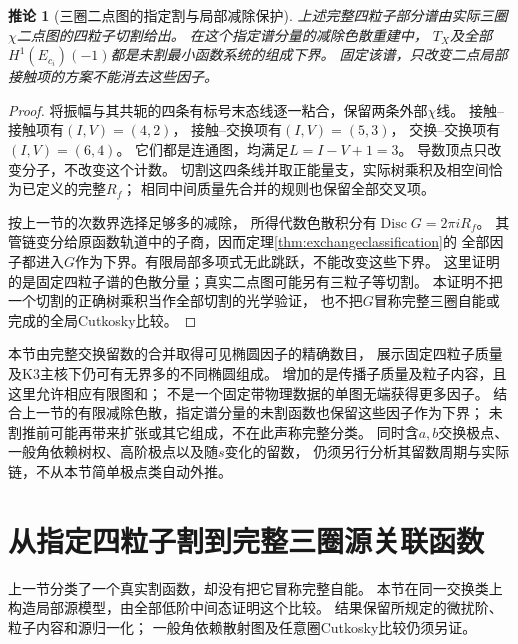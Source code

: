 \documentclass[11pt,a4paper]{ctexart}
\theoremstyle{cnplain}\newtheorem{theorem}{定理}[section]
\newtheorem{corollary}[theorem]{推论}
\theoremstyle{definition}\newtheorem{definition}[theorem]{定义}
\theoremstyle{remark}\newtheorem{remark}[theorem]{注}
\begin{document}
\begin{corollary}[三圈二点图的指定割与局部减除保护]\label{cor:exchangethreeloop}
上述完整四粒子部分谱由实际三圈$\chi$二点图的四粒子切割给出。
在这个指定谱分量的减除色散重建中，
$T_X$及全部$H^1(E_{c_i})(-1)$都是未割最小函数系统的组成下界。
固定该谱，只改变二点局部接触项的方案不能消去这些因子。
\end{corollary}
\begin{proof}
将振幅与其共轭的四条有标号末态线逐一粘合，保留两条外部$\chi$线。
接触--接触项有$(I,V)=(4,2)$，
接触--交换项有$(I,V)=(5,3)$，
交换--交换项有$(I,V)=(6,4)$。
它们都是连通图，均满足$L=I-V+1=3$。
导数顶点只改变分子，不改变这个计数。
切割这四条线并取正能量支，实际树乘积及相空间恰为已定义的完整$R_f$；
相同中间质量先合并的规则也保留全部交叉项。

按上一节的次数界选择足够多的减除，
所得代数色散积分有$\operatorname{Disc}G=2\pi iR_f$。
其管链变分给原函数轨道中的子商，因而定理\ref{thm:exchangeclassification}的
全部因子都进入$G$作为下界。有限局部多项式无此跳跃，不能改变这些下界。
这里证明的是固定四粒子谱的色散分量；真实二点图可能另有三粒子等切割。
本证明不把一个切割的正确树乘积当作全部切割的光学验证，
也不把$G$冒称完整三圈自能或完成的全局Cutkosky比较。
\end{proof}

本节由完整交换留数的合并取得可见椭圆因子的精确数目，
展示固定四粒子质量及K3主核下仍可有无界多的不同椭圆组成。
增加的是传播子质量及粒子内容，且这里允许相应有限图和；
不是一个固定带物理数据的单图无端获得更多因子。
结合上一节的有限减除色散，指定谱分量的未割函数也保留这些因子作为下界；
未割推前可能再带来扩张或其它组成，不在此声称完整分类。
同时含$a,b$交换极点、一般角依赖树权、高阶极点以及随$s$变化的留数，
仍须另行分析其留数周期与实际链，不从本节简单极点类自动外推。


\section{从指定四粒子割到完整三圈源关联函数}\label{sec:fullsourcebridge}
上一节分类了一个真实割函数，却没有把它冒称完整自能。
本节在同一交换类上构造局部源模型，由全部低阶中间态证明这个比较。
结果保留所规定的微扰阶、粒子内容和源归一化；
一般角依赖散射图及任意圈Cutkosky比较仍须另证。
\end{document}
